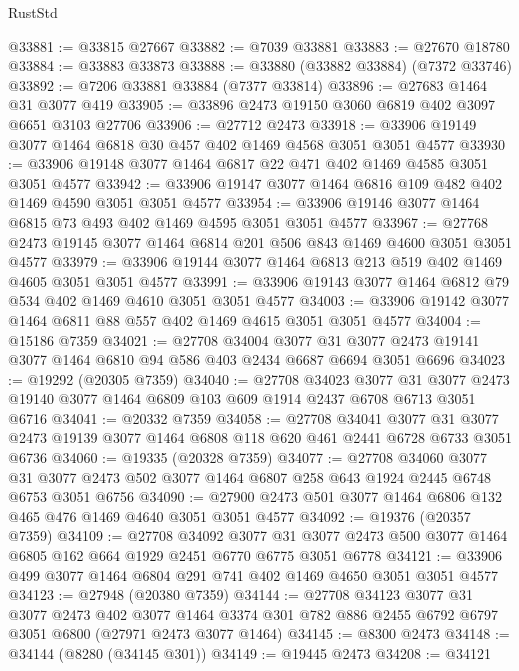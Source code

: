 \begin{lexlean}{RustStd}
\begin{coremodule}
@33881 := @33815 @27667
@33882 := @7039 @33881
@33883 := @27670 @18780
@33884 := @33883 @33873
@33888 := @33880 (@33882 @33884) (@7372 @33746)
@33892 := @7206 @33881 @33884 (@7377 @33814)
@33896 := @27683 @1464 @31 @3077 @419
@33905 := @33896 @2473 @19150 @3060 @6819 @402 @3097 @6651 @3103 @27706
@33906 := @27712 @2473
@33918 := @33906 @19149 @3077 @1464 @6818 @30 @457 @402 @1469 @4568 @3051 @3051 @4577
@33930 := @33906 @19148 @3077 @1464 @6817 @22 @471 @402 @1469 @4585 @3051 @3051 @4577
@33942 := @33906 @19147 @3077 @1464 @6816 @109 @482 @402 @1469 @4590 @3051 @3051 @4577
@33954 := @33906 @19146 @3077 @1464 @6815 @73 @493 @402 @1469 @4595 @3051 @3051 @4577
@33967 := @27768 @2473 @19145 @3077 @1464 @6814 @201 @506 @843 @1469 @4600 @3051 @3051 @4577
@33979 := @33906 @19144 @3077 @1464 @6813 @213 @519 @402 @1469 @4605 @3051 @3051 @4577
@33991 := @33906 @19143 @3077 @1464 @6812 @79 @534 @402 @1469 @4610 @3051 @3051 @4577
@34003 := @33906 @19142 @3077 @1464 @6811 @88 @557 @402 @1469 @4615 @3051 @3051 @4577
@34004 := @15186 @7359
@34021 := @27708
    @34004
    @3077
    @31
    @3077
    @2473
    @19141
    @3077
    @1464
    @6810
    @94
    @586
    @403
    @2434
    @6687
    @6694
    @3051
    @6696
@34023 := @19292 (@20305 @7359)
@34040 := @27708
    @34023
    @3077
    @31
    @3077
    @2473
    @19140
    @3077
    @1464
    @6809
    @103
    @609
    @1914
    @2437
    @6708
    @6713
    @3051
    @6716
@34041 := @20332 @7359
@34058 := @27708
    @34041
    @3077
    @31
    @3077
    @2473
    @19139
    @3077
    @1464
    @6808
    @118
    @620
    @461
    @2441
    @6728
    @6733
    @3051
    @6736
@34060 := @19335 (@20328 @7359)
@34077 := @27708
    @34060
    @3077
    @31
    @3077
    @2473
    @502
    @3077
    @1464
    @6807
    @258
    @643
    @1924
    @2445
    @6748
    @6753
    @3051
    @6756
@34090 := @27900 @2473 @501 @3077 @1464 @6806 @132 @465 @476 @1469 @4640 @3051 @3051 @4577
@34092 := @19376 (@20357 @7359)
@34109 := @27708
    @34092
    @3077
    @31
    @3077
    @2473
    @500
    @3077
    @1464
    @6805
    @162
    @664
    @1929
    @2451
    @6770
    @6775
    @3051
    @6778
@34121 := @33906 @499 @3077 @1464 @6804 @291 @741 @402 @1469 @4650 @3051 @3051 @4577
@34123 := @27948 (@20380 @7359)
@34144 := @27708
    @34123
    @3077
    @31
    @3077
    @2473
    @402
    @3077
    @1464
    @3374
    @301
    @782
    @886
    @2455
    @6792
    @6797
    @3051
    @6800
    (@27971 @2473 @3077 @1464)
@34145 := @8300 @2473
@34148 := @34144 (@8280 (@34145 @301))
@34149 := @19445 @2473
@34208 := @34121

\end{coremodule}
\end{lexlean}
